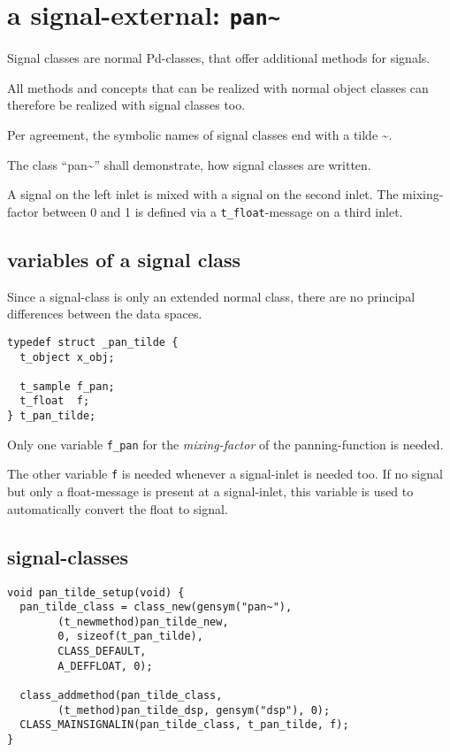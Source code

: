 \documentclass[12pt, a4paper,english,titlepage]{article}
\begin{document}
\section{a signal-external: {\tt pan\~\/}}
Signal classes are normal Pd-classes, that offer additional methods for signals.


All methods and concepts that can be realized with normal object classes can
therefore be realized with signal classes too.

Per agreement, the symbolic names of signal classes end with a tilde \~\/.

The class ``pan\~\/'' shall demonstrate, how signal classes are written.

A signal on the left inlet is mixed with a signal on the second inlet.
The mixing-factor between 0 and 1 is defined via a \verb+t_float+-message
on a third inlet.

\subsection{variables of a signal class}
Since a signal-class is only an extended normal class,
there are no principal differences between the data spaces.

\begin{verbatim}
typedef struct _pan_tilde {
  t_object x_obj;

  t_sample f_pan;
  t_float  f;
} t_pan_tilde;
\end{verbatim}

Only one variable \verb+f_pan+ for the {\em mixing-factor} of the panning-function is needed.

The other variable \verb+f+ is needed whenever a signal-inlet is needed too.
If no signal but only a float-message is present at a signal-inlet, this
variable is used to automatically convert the float to signal.

\subsection{signal-classes}

\begin{verbatim}
void pan_tilde_setup(void) {
  pan_tilde_class = class_new(gensym("pan~"),
        (t_newmethod)pan_tilde_new,
        0, sizeof(t_pan_tilde),
        CLASS_DEFAULT, 
        A_DEFFLOAT, 0);

  class_addmethod(pan_tilde_class,
        (t_method)pan_tilde_dsp, gensym("dsp"), 0);
  CLASS_MAINSIGNALIN(pan_tilde_class, t_pan_tilde, f);
}
\end{verbatim}
\end{document}
